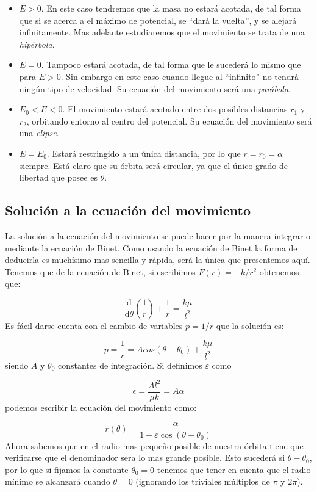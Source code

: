 \documentclass[12pt,a4paper]{book}
\newcommand{\parentesis}[1]{\left( #1  \right)}
\newcommand{\D}{\mathrm{d}}
\begin{document}
\begin{itemize}
\item $E>0$. En este caso tendremos que la masa no estará acotada, de tal forma que si se acerca a el máximo de potencial, se ``dará la vuelta'', y se alejará infinitamente. Mas adelante estudiaremos que el movimiento se trata de una \textit{hipérbola}.

\item $E=0$. Tampoco estará acotada, de tal forma que le sucederá lo mismo que para $E>0$. Sin embargo en este caso cuando llegue al ``infinito'' no tendrá ningún tipo de velocidad. Su ecuación del movimiento será una \textit{parábola}.

\item $E_0<E<0$. El movimiento estará acotado entre dos posibles distancias $r_1$ y $r_2$, orbitando entorno al centro del potencial. Su ecuación del movimiento será una \textit{elipse}.

\item $E=E_0$. Estará restringido a un única distancia, por lo que $r=r_0=\alpha$ siempre. Está claro que su órbita será circular, ya que el único grado de libertad que posee es $\theta$. 
\end{itemize}

\subsection{Solución a la ecuación del movimiento}

La solución a la ecuación del movimiento se puede hacer por la manera integrar o mediante la ecuación de Binet. Como usando la ecuación de Binet la forma de deducirla es muchísimo mas sencilla y rápida, será la única que presentemos aquí. Tenemos que de la ecuación de Binet, si escribimos $F(r) = - k/r^2$ obtenemos que:

$$ \dfrac{\D}{\D \theta} \parentesis{\frac{1}{r}} + \dfrac{1}{r} = \dfrac{k \mu}{l^2} $$
Es fácil darse cuenta con el cambio de variables $p = 1/r$ que la solución es:

$$
p = \dfrac{1}{r} = A cos(\theta - \theta_0) + \dfrac{k \mu }{l^2}
$$
siendo $A$ y $\theta_0$ constantes de integración. Si definimos $\varepsilon$ como

\begin{equation}
\epsilon = \dfrac{A l^2}{\mu k} = A \alpha
\end{equation}
podemos escribir la ecuación del movimiento como:

\begin{equation}
r(\theta) = \dfrac{\alpha}{1 + \varepsilon \cos (\theta - \theta_0)}
\end{equation}
Ahora sabemos que en el radio mas pequeño posible de nuestra órbita tiene que verificarse que el denominador sera lo mas grande posible. Esto sucederá si $\theta-\theta_0$, por lo que si fijamos la constante $\theta_0 = 0$ tenemos que tener en cuenta que el radio mínimo se alcanzará cuando $\theta  =0 $ (ignorando los triviales múltiplos de $\pi$ y $2\pi$).
\end{document}
